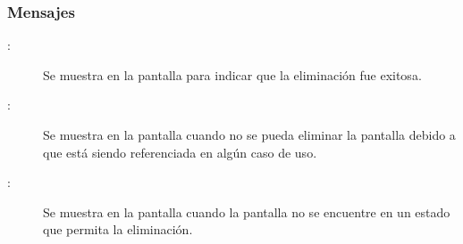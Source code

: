 \subsubsection{Mensajes}
	
\begin{description}
	\item[:] Se muestra en la pantalla  para indicar que la eliminación fue exitosa.
	\item[:] Se muestra en la pantalla  cuando no se pueda eliminar la pantalla debido a que está siendo referenciada en algún caso de uso.
	\item[:] Se muestra en la pantalla  cuando la pantalla no se encuentre en un estado que permita la eliminación.
	
\end{description}
